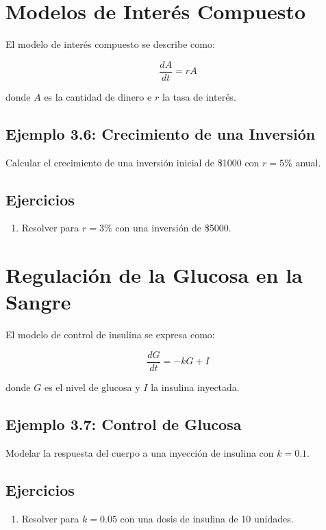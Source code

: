 \section{Modelos de Interés Compuesto}
El modelo de interés compuesto se describe como:

\begin{equation}
\frac{dA}{dt} = r A
\end{equation}

donde \( A \) es la cantidad de dinero e \( r \) la tasa de interés.

\subsection*{Ejemplo 3.6: Crecimiento de una Inversión}
Calcular el crecimiento de una inversión inicial de \$1000 con \( r = 5\% \) anual.

\subsection*{Ejercicios}
\begin{enumerate}
    \item Resolver para \( r = 3\% \) con una inversión de \$5000.
\end{enumerate}

\section{Regulación de la Glucosa en la Sangre}
El modelo de control de insulina se expresa como:

\begin{equation}
\frac{dG}{dt} = -k G + I
\end{equation}

donde \( G \) es el nivel de glucosa y \( I \) la insulina inyectada.

\subsection*{Ejemplo 3.7: Control de Glucosa}
Modelar la respuesta del cuerpo a una inyección de insulina con \( k = 0.1 \).

\subsection*{Ejercicios}
\begin{enumerate}
    \item Resolver para \( k = 0.05 \) con una dosis de insulina de 10 unidades.
\end{enumerate}

